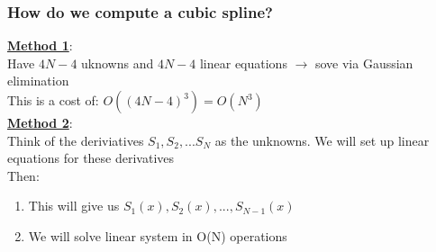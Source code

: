 \documentclass[12pt]{article}
\newcommand{\myt}[1]{\textbf{\underline{#1}}}
\begin{document}
	\subsubsection*{How do we compute a cubic spline?}
	\myt{Method 1}:\\
	Have $4N-4$ uknowns and $4N-4$ linear equations $\rightarrow$ sove via Gaussian elimination\\
	This is a cost of: $O((4N-4)^3) = O(N^3)$\\
	
	\myt{Method 2}:\\
	Think of the deriviatives $S_1, S_2, ... S_N$ as the unknowns. We will set up linear equations for these derivatives\\
	Then:\\
	\begin{enumerate}
		\item This will give us $S_1(x),S_2(x), ..., S_{N-1}(x)$
		\item We will solve linear system in O(N) operations
	\end{enumerate}


	
	
\end{document}
